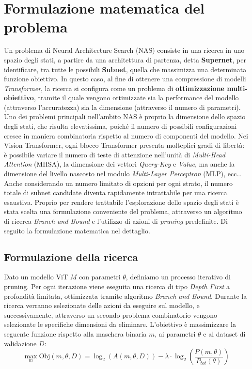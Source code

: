 \chapter{Formulazione matematica del problema}
\label{cap:teoria}
Un problema di Neural Architecture Search (NAS) consiste in una ricerca in uno
spazio degli stati, a partire da una architettura di partenza, detta
\textbf{Supernet}, per identificare, tra tutte le possibili \textbf{Subnet},
quella che massimizza una determinata funzione obiettivo. In questo caso, al
fine di ottenere una compressione di modelli \textit{Transformer}, la ricerca
si configura come un problema di \textbf{ottimizzazione multi-obiettivo},
tramite il quale vengono ottimizzate sia la performance del modello (attraverso
l'accuratezza) sia la dimensione (attraverso il numero di parametri). \newline
Uno dei problemi principali nell'ambito NAS è proprio la dimensione dello
spazio degli stati, che risulta elevatissima, poiché il numero di possibili
configurazioni cresce in maniera combinatoria rispetto al numero di componenti
del modello. Nei Vision Transformer, ogni blocco Transformer presenta
molteplici gradi di libertà: è possibile variare il numero di teste di
attenzione nell'unità di \textit{Multi-Head Attention} (MHSA), la dimensione
dei vettori \textit{Query-Key} e \textit{Value}, ma anche la dimensione del
livello nascosto nel modulo \textit{Multi-Layer Perceptron} (MLP), ecc\ldots
Anche considerando un numero limitato di opzioni per ogni strato, il numero
totale di subnet candidate diventa rapidamente intrattabile per una ricerca
esaustiva. \newline Proprio per rendere trattabile l'esplorazione dello spazio
degli stati è stata scelta una formulazione conveniente del problema,
attraverso un algoritmo di ricerca \textit{Branch and Bound} e l'utilizzo di
azioni di \textit{pruning} predefinite. Di seguito la formulazione matematica
nel dettaglio.\newline

\section{Formulazione della ricerca}
Dato un modello ViT $M$ con parametri $\theta$, definiamo un processo iterativo
di pruning. Per ogni iterazione viene eseguita una ricerca di tipo
\textit{Depth First} a profondità limitata, ottimizzata tramite algoritmo
\textit{Branch and Bound}. Durante la ricerca verranno selezionate delle azioni
da eseguire sul modello, e successivamente, attraverso un secondo problema
combinatorio vengono selezionate le specifiche dimensioni da eliminare.
L'obiettivo è massimizzare la seguente funzione rispetto alla maschera binaria
$m$, ai parametri $\theta$ e al dataset di validazione $D$:
\begin{equation}
    \max_{m} \text{Obj}(m, \theta, D) = \log_2({A}(m, \theta, D)) - \lambda \cdot \log_2\left(\frac{{P}(m, \theta)}{{P}_{tot}(\theta)}\right)
\end{equation}

